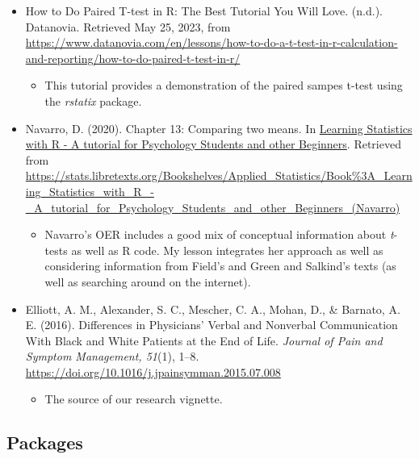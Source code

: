 \documentclass[
  11pt,
]{book}
\providecommand{\tightlist}{%
  \setlength{\itemsep}{0pt}\setlength{\parskip}{0pt}}
\begin{document}
\begin{itemize}
\tightlist
\item
  How to Do Paired T-test in R: The Best Tutorial You Will Love. (n.d.). Datanovia. Retrieved May 25, 2023, from \url{https://www.datanovia.com/en/lessons/how-to-do-a-t-test-in-r-calculation-and-reporting/how-to-do-paired-t-test-in-r/}

  \begin{itemize}
  \tightlist
  \item
    This tutorial provides a demonstration of the paired sampes t-test using the \emph{rstatix} package.
  \end{itemize}
\item
  Navarro, D. (2020). Chapter 13: Comparing two means. In \href{https://learningstatisticswithr.com/}{Learning Statistics with R - A tutorial for Psychology Students and other Beginners}. Retrieved from \url{https://stats.libretexts.org/Bookshelves/Applied_Statistics/Book\%3A_Learning_Statistics_with_R_-_A_tutorial_for_Psychology_Students_and_other_Beginners_(Navarro)}

  \begin{itemize}
  \tightlist
  \item
    Navarro's OER includes a good mix of conceptual information about \emph{t}-tests as well as R code. My lesson integrates her approach as well as considering information from Field's \citeyearpar{field_discovering_2012} and Green and Salkind's \citep{green_using_2017} texts (as well as searching around on the internet).
  \end{itemize}
\item
  Elliott, A. M., Alexander, S. C., Mescher, C. A., Mohan, D., \& Barnato, A. E. (2016). Differences in Physicians' Verbal and Nonverbal Communication With Black and White Patients at the End of Life. \emph{Journal of Pain and Symptom Management, 51}(1), 1--8. \url{https://doi.org/10.1016/j.jpainsymman.2015.07.008}

  \begin{itemize}
  \tightlist
  \item
    The source of our research vignette.
  \end{itemize}
\end{itemize}

\hypertarget{packages-2}{%
\subsection{Packages}\label{packages-2}}
\end{document}
